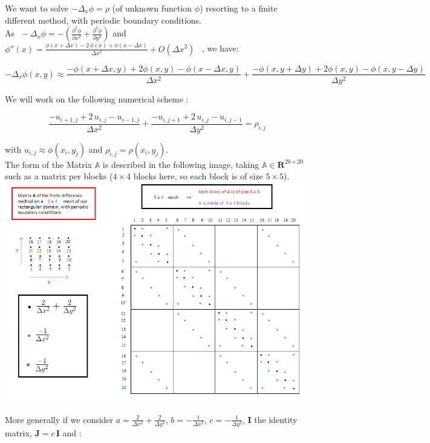\documentclass[10pt]{article}
\begin{document}
We want to solve $ - \Delta_x \phi = \rho $ (of unknown function $\phi$) resorting to a finite different method, with periodic boundary conditions.\\

As $\; - \Delta_x \phi = - \left( \frac{\partial^2\phi}{\partial x^2} + \frac{\partial^2\phi}{\partial y^2} \right)$ and  $\phi''(x)= \frac{\phi(x+\Delta x) - 2\,\phi(x) + \phi(x-\Delta x)}{\Delta x^2} + O(\Delta x^2) \;\;\; $, we have: 

$$ - \Delta_x \phi(x,y) \approx \frac{ -\phi (x+\Delta x,y) +2 \phi (x,y) - \phi (x-\Delta x,y)}{\Delta x^2} +  \frac{ -\phi (x,y+\Delta y) + 2 \phi (x,y) - \phi (x,y-\Delta y)}{\Delta y^2}$$

We will work on the following numerical scheme :


$$\boxed{\frac{ -u_{i+1,j} +2\,u_{i,j} - u_{i-1,j}}{\Delta x^2} +  \frac{ -u_{i,j+1} + 2\,u_{i,j} - u_{i,j-1}}{\Delta y^2} = \rho_{i,j}}$$

with $u_{i,j} \approx \phi( x_i,y_j)$ and $\rho_{i,j} = \rho(x_i,y_j)$.\\

The form of the Matrix $\mathbb{A}$ is described in the following image, taking $\mathbb{A}\in\mathbf{R}^{20\times 20}$ such as a matrix per blocks ($4\times 4$ blocks here, so each block is of size $5\times 5$).\\

\includegraphics[scale=0.75]{Matrix_part5.png}

More generally if we consider $a = \frac{2}{\Delta x^2}+\frac{2}{\Delta y^2}$, $b = -\frac{1}{\Delta x^2}$, $c = -\frac{1}{\Delta y^2}$, $\mathbf{I}$ the identity matrix, $\mathbf{J} = c\,\mathbf{I}$ and :
\end{document}
